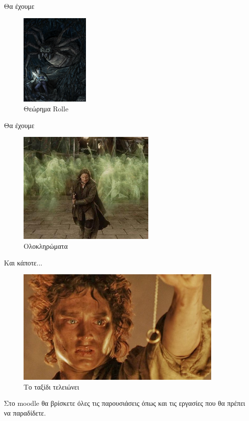 \documentclass{presentation}
\begin{document}
\begin{frame}{Θα έχουμε}
  \begin{figure}
    \centering
    \includegraphics[width=0.3\textwidth]{"images/shelob"}
    \caption{Θεώρημα Rolle}
  \end{figure}
\end{frame}

\begin{frame}{Θα έχουμε}
  \begin{figure}
    \centering
    \includegraphics[width=0.6\textwidth]{"images/armyofdead"}
    \caption{Ολοκληρώματα}
  \end{figure}
\end{frame}

\begin{frame}{Και κάποτε...}
  \begin{figure}
    \centering
    \includegraphics[width=0.9\textwidth]{"images/frodo2"}
    \caption{Το ταξίδι τελειώνει}
  \end{figure}
\end{frame}

\begin{frame}
  Στο moodle θα βρίσκετε όλες τις παρουσιάσεις όπως και τις εργασίες που θα πρέπει να παραδίδετε.
\end{frame}
\end{document}
